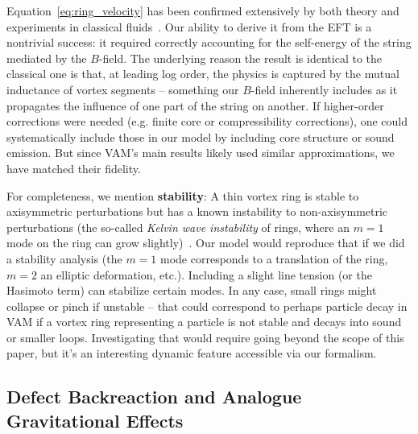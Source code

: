 \documentclass[12pt]{article}
\begin{document}
Equation~\eqref{eq:ring_velocity} has been confirmed extensively by both theory and experiments in classical fluids~\cite{ref:fonda}. Our ability to derive it from the EFT is a nontrivial success: it required correctly accounting for the self-energy of the string mediated by the $B$-field. The underlying reason the result is identical to the classical one is that, at leading log order, the physics is captured by the mutual inductance of vortex segments -- something our $B$-field inherently includes as it propagates the influence of one part of the string on another. If higher-order corrections were needed (e.g. finite core or compressibility corrections), one could systematically include those in our model by including core structure or sound emission. But since VAM’s main results likely used similar approximations, we have matched their fidelity.

For completeness, we mention \textbf{stability}: A thin vortex ring is stable to axisymmetric perturbations but has a known instability to non-axisymmetric perturbations (the so-called \textit{Kelvin wave instability} of rings, where an $m=1$ mode on the ring can grow slightly)~\cite{ref:kelvin_instability}. Our model would reproduce that if we did a stability analysis (the $m=1$ mode corresponds to a translation of the ring, $m=2$ an elliptic deformation, etc.). Including a slight line tension (or the Hasimoto term) can stabilize certain modes. In any case, small rings might collapse or pinch if unstable -- that could correspond to perhaps particle decay in VAM if a vortex ring representing a particle is not stable and decays into sound or smaller loops. Investigating that would require going beyond the scope of this paper, but it’s an interesting dynamic feature accessible via our formalism.

\subsection{Defect Backreaction and Analogue Gravitational Effects}
\end{document}
